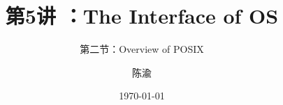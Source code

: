 


\title[第5讲]{第5讲 ：The Interface of OS} %
\subtitle{第二节：Overview of POSIX }
\author{陈渝} %
\date{\today} %




\begin{frame}
\titlepage %
\end{frame}


